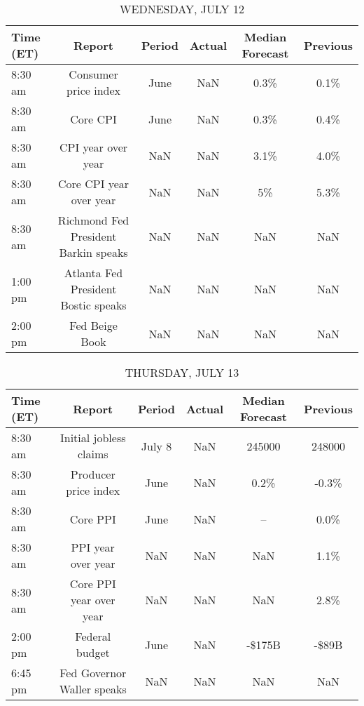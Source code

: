 \documentclass{article}%
\begin{document}
\begin{table}[htbp]%
\caption{WEDNESDAY, JULY 12}%
\centering%
\begin{adjustbox}{width=1\textwidth}%
\begin{tabular}{lccccc}
\toprule
Time (ET) &                               Report & Period & Actual & Median Forecast & Previous \\
\midrule
  8:30 am &                 Consumer price index &   June &    NaN &            0.3\% &     0.1\% \\
  8:30 am &                             Core CPI &   June &    NaN &            0.3\% &     0.4\% \\
  8:30 am &                   CPI year over year &    NaN &    NaN &            3.1\% &     4.0\% \\
  8:30 am &              Core CPI year over year &    NaN &    NaN &              5\% &     5.3\% \\
  8:30 am & Richmond Fed President Barkin speaks &    NaN &    NaN &             NaN &      NaN \\
  1:00 pm &  Atlanta Fed President Bostic speaks &    NaN &    NaN &             NaN &      NaN \\
  2:00 pm &                       Fed Beige Book &    NaN &    NaN &             NaN &      NaN \\
\bottomrule
\end{tabular}
%
\end{adjustbox}%
\end{table}

%


\begin{table}[htbp]%
\caption{THURSDAY, JULY 13}%
\centering%
\begin{adjustbox}{width=1\textwidth}%
\begin{tabular}{lccccc}
\toprule
Time (ET) &                     Report & Period & Actual & Median Forecast & Previous \\
\midrule
  8:30 am &     Initial jobless claims & July 8 &    NaN &          245000 &   248000 \\
  8:30 am &       Producer price index &   June &    NaN &            0.2\% &    -0.3\% \\
  8:30 am &                   Core PPI &   June &    NaN &              -- &     0.0\% \\
  8:30 am &         PPI year over year &    NaN &    NaN &             NaN &     1.1\% \\
  8:30 am &    Core PPI year over year &    NaN &    NaN &             NaN &     2.8\% \\
  2:00 pm &             Federal budget &   June &    NaN &          -\$175B &    -\$89B \\
  6:45 pm & Fed Governor Waller speaks &    NaN &    NaN &             NaN &      NaN \\
\bottomrule
\end{tabular}
%
\end{adjustbox}%
\end{table}
\end{document}
